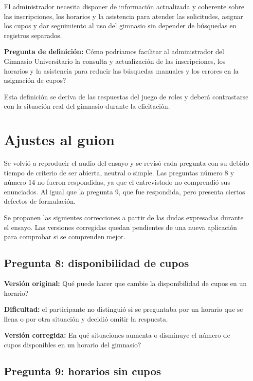 \documentclass[11pt,a4paper]{article}
\begin{document}
El administrador necesita disponer de información actualizada y coherente
sobre las inscripciones, los horarios y la asistencia para atender las
solicitudes, asignar los cupos y dar seguimiento al uso del gimnasio sin
depender de búsquedas en registros separados.

\textbf{Pregunta de definición:}
\textquestiondown{}Cómo podríamos facilitar al administrador del Gimnasio
Universitario la consulta y actualización de las inscripciones, los horarios
y la asistencia para reducir las búsquedas manuales y los errores en la
asignación de cupos?

Esta definición se deriva de las respuestas del juego de roles y deberá
contrastarse con la situación real del gimnasio durante la elicitación.

\section{Ajustes al guion}

Se volvió a reproducir el audio del ensayo y se revisó cada pregunta con su debido tiempo de criterio de ser abierta, neutral o simple. Las preguntas número 8 y número 14 no fueron respondidas, ya que el entrevistado no comprendió sus enunciados. Al igual que la pregunta 9, que fue respondida, pero presenta ciertos defectos de formulación.

Se proponen las siguientes correcciones a partir de las dudas expresadas durante el ensayo. Las versiones corregidas quedan pendientes de una nueva aplicación para comprobar si se comprenden mejor.

\subsection*{Pregunta 8: disponibilidad de cupos}

\textbf{Versión original:} \textquestiondown{}Qué puede hacer que cambie la disponibilidad de cupos en un horario?

\textbf{Dificultad:} el participante no distinguió si se preguntaba por un horario que se llena o por otra situación y decidió omitir la respuesta.

\textbf{Versión corregida:} \textquestiondown{}En qué situaciones aumenta o disminuye el número de cupos disponibles en un horario del gimnasio?

\subsection*{Pregunta 9: horarios sin cupos}
\end{document}

